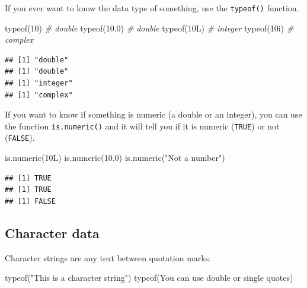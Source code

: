 \documentclass[
  oneside]{book}
\newenvironment{Shaded}{\begin{snugshade}}{\end{snugshade}}
\newcommand{\CommentTok}[1]{\textcolor[rgb]{0.56,0.35,0.01}{\textit{#1}}}
\newcommand{\DecValTok}[1]{\textcolor[rgb]{0.00,0.00,0.81}{#1}}
\newcommand{\FloatTok}[1]{\textcolor[rgb]{0.00,0.00,0.81}{#1}}
\newcommand{\FunctionTok}[1]{\textcolor[rgb]{0.00,0.00,0.00}{#1}}
\newcommand{\NormalTok}[1]{#1}
\newcommand{\StringTok}[1]{\textcolor[rgb]{0.31,0.60,0.02}{#1}}
\begin{document}
If you ever want to know the data type of something, use the \texttt{typeof()} function.

\begin{Shaded}
\begin{Highlighting}[]
\FunctionTok{typeof}\NormalTok{(}\DecValTok{10}\NormalTok{)   }\CommentTok{\# double}
\FunctionTok{typeof}\NormalTok{(}\FloatTok{10.0}\NormalTok{) }\CommentTok{\# double}
\FunctionTok{typeof}\NormalTok{(10L)  }\CommentTok{\# integer}
\FunctionTok{typeof}\NormalTok{(10i)  }\CommentTok{\# complex}
\end{Highlighting}
\end{Shaded}

\begin{verbatim}
## [1] "double"
## [1] "double"
## [1] "integer"
## [1] "complex"
\end{verbatim}

If you want to know if something is numeric (a double or an integer), you can use the function \texttt{is.numeric()} and it will tell you if it is numeric (\texttt{TRUE}) or not (\texttt{FALSE}).

\begin{Shaded}
\begin{Highlighting}[]
\FunctionTok{is.numeric}\NormalTok{(10L)}
\FunctionTok{is.numeric}\NormalTok{(}\FloatTok{10.0}\NormalTok{)}
\FunctionTok{is.numeric}\NormalTok{(}\StringTok{"Not a number"}\NormalTok{)}
\end{Highlighting}
\end{Shaded}

\begin{verbatim}
## [1] TRUE
## [1] TRUE
## [1] FALSE
\end{verbatim}

\hypertarget{character-data}{%
\subsection{Character data}\label{character-data}}

Character strings are any text between quotation marks.

\begin{Shaded}
\begin{Highlighting}[]
\FunctionTok{typeof}\NormalTok{(}\StringTok{"This is a character string"}\NormalTok{)}
\FunctionTok{typeof}\NormalTok{(}\StringTok{\textquotesingle{}You can use double or single quotes\textquotesingle{}}\NormalTok{)}
\end{Highlighting}
\end{Shaded}
\end{document}
